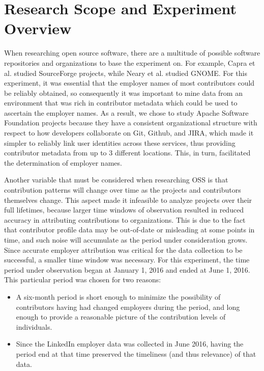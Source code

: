 \section{Research Scope and Experiment Overview}
When researching open source software, there are a multitude of possible software repositories and organizations to base the experiment on. For example, Capra et al. studied SourceForge projects, while Neary et al. studied GNOME. 
 
For this experiment, it was essential that the employer names of most contributors could be reliably obtained, so consequently it was important to mine data from an environment that was rich in contributor metadata which could be used to ascertain the employer names. As a result, we chose to study Apache Software Foundation projects because they have a consistent organizational structure with respect to how developers collaborate on Git, Github, and JIRA, which made it simpler to reliably link user identities across these services, thus providing contributor metadata from up to 3 different locations. This, in turn, facilitated the determination of employer names.

Another variable that must be considered when researching OSS is that contribution patterns will change over time as the projects and contributors themselves change. This aspect made it infeasible to analyze projects over their full lifetimes, because larger time windows of observation resulted in reduced accuracy in attributing contributions to organizations. This is due to the fact that contributor profile data may be out-of-date or misleading at some points in time, and such noise will accumulate as the period under consideration grows. Since accurate employer attribution was critical for the data collection to be successful, a smaller time window was necessary. For this experiment, the time period \timeperiod{} under observation began at January 1, 2016 and ended at June 1, 2016. This particular period was chosen for two reasons:
\begin{itemize}
	\item A six-month period is short enough to minimize the possibility of contributors having had changed employers during the period, and long enough to provide a reasonable picture of the contribution levels of individuals.
	\item Since the LinkedIn employer data was collected in June 2016, having the period end at that time preserved the timeliness (and thus relevance) of that data.
\end{itemize}

